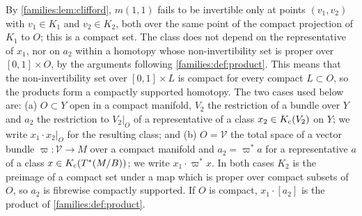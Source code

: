 By \cref{families:lem:clifford}, $m(1,1)$ fails to be invertible only at
points $(v_1,v_2)$ with $v_1\in K_1$ and $v_2\in K_2$, both over the same
point of the compact projection of $K_1$ to $O$; this is a compact set. The
class does not depend on the representative of $x_1$, nor on $a_2$ within a
homotopy whose non-invertibility set is proper over $[0,1]\times O$, by the
arguments following \cref{families:def:product}. This means that the
non-invertibility set over $[0,1]\times L$ is compact for every compact
$L\subset O$, so the products form a compactly supported homotopy. The two cases used below are: (a)
$O\subset Y$ open in a compact manifold, $V_2$ the restriction of a bundle over
$Y$ and $a_2$ the restriction to $V_2|_O$ of a representative of a class
$x_2\in K_{\mathrm{c}}(V_2)$ on $Y$; we write $x_1\cdot x_2|_O$ for the resulting class;
and (b) $O=\mathcal V$ the total space of a vector bundle $\varpi:\mathcal
V\to M$ over a compact manifold and $a_2=\varpi^*a$ for a representative $a$
of a class $x\in K_{\mathrm{c}}(T^*(M/B))$; we write $x_1\cdot\varpi^*x$. In both cases
$K_2$ is the preimage of a compact set under a map which is proper over
compact subsets of $O$, so $a_2$ is fibrewise compactly supported. If $O$ is
compact, $x_1\cdot[a_2]$ is the product of \cref{families:def:product}.

